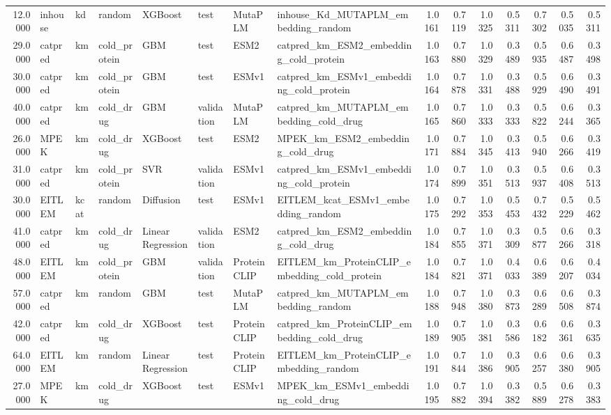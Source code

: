 \begin{tabular}{rlllllllrrrrrrr}
12.0000 & inhouse & kd & random & XGBoost & test & MutaPLM & inhouse_Kd_MUTAPLM_embedding_random & 1.0161 & 0.7119 & 1.0325 & 0.5311 & 0.7302 & 0.5035 & 0.5311 \\
29.0000 & catpred & km & cold_protein & GBM & test & ESM2 & catpred_km_ESM2_embedding_cold_protein & 1.0163 & 0.7880 & 1.0329 & 0.3489 & 0.5935 & 0.6487 & 0.3498 \\
30.0000 & catpred & km & cold_protein & GBM & test & ESMv1 & catpred_km_ESMv1_embedding_cold_protein & 1.0164 & 0.7878 & 1.0331 & 0.3488 & 0.5929 & 0.6490 & 0.3491 \\
40.0000 & catpred & km & cold_drug & GBM & validation & MutaPLM & catpred_km_MUTAPLM_embedding_cold_drug & 1.0165 & 0.7860 & 1.0333 & 0.3333 & 0.5822 & 0.6244 & 0.3365 \\
26.0000 & MPEK & km & cold_drug & XGBoost & test & ESM2 & MPEK_km_ESM2_embedding_cold_drug & 1.0171 & 0.7884 & 1.0345 & 0.3413 & 0.5940 & 0.6266 & 0.3419 \\
31.0000 & catpred & km & cold_protein & SVR & validation & ESMv1 & catpred_km_ESMv1_embedding_cold_protein & 1.0174 & 0.7899 & 1.0351 & 0.3513 & 0.5937 & 0.6408 & 0.3513 \\
30.0000 & EITLEM & kcat & random & Diffusion & test & ESMv1 & EITLEM_kcat_ESMv1_embedding_random & 1.0175 & 0.7292 & 1.0353 & 0.5453 & 0.7432 & 0.5229 & 0.5462 \\
41.0000 & catpred & km & cold_drug & Linear Regression & validation & ESM2 & catpred_km_ESM2_embedding_cold_drug & 1.0184 & 0.7855 & 1.0371 & 0.3309 & 0.5877 & 0.6266 & 0.3318 \\
48.0000 & EITLEM & km & cold_protein & GBM & validation & ProteinCLIP & EITLEM_km_ProteinCLIP_embedding_cold_protein & 1.0184 & 0.7821 & 1.0371 & 0.4033 & 0.6389 & 0.6207 & 0.4034 \\
57.0000 & catpred & km & random & GBM & test & MutaPLM & catpred_km_MUTAPLM_embedding_random & 1.0188 & 0.7948 & 1.0380 & 0.3873 & 0.6289 & 0.6508 & 0.3874 \\
42.0000 & catpred & km & cold_drug & XGBoost & test & ProteinCLIP & catpred_km_ProteinCLIP_embedding_cold_drug & 1.0189 & 0.7905 & 1.0381 & 0.3586 & 0.6182 & 0.6361 & 0.3635 \\
64.0000 & EITLEM & km & random & Linear Regression & test & ProteinCLIP & EITLEM_km_ProteinCLIP_embedding_random & 1.0191 & 0.7844 & 1.0386 & 0.3905 & 0.6257 & 0.6380 & 0.3905 \\
27.0000 & MPEK & km & cold_drug & XGBoost & test & ESMv1 & MPEK_km_ESMv1_embedding_cold_drug & 1.0195 & 0.7882 & 1.0394 & 0.3382 & 0.5889 & 0.6278 & 0.3383 \\

\end{tabular}
